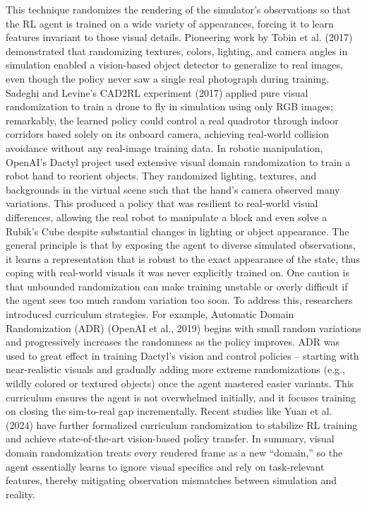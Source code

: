 This technique randomizes the rendering of the simulator’s observations so that the RL agent is trained on a wide variety of appearances, forcing it to learn features invariant to those visual details. Pioneering work by Tobin et al. (2017) demonstrated that randomizing textures, colors, lighting, and camera angles in simulation enabled a vision-based object detector to generalize to real images, even though the policy never saw a single real photograph during training. Sadeghi and Levine’s CAD2RL experiment (2017) applied pure visual randomization to train a drone to fly in simulation using only RGB images; remarkably, the learned policy could control a real quadrotor through indoor corridors based solely on its onboard camera, achieving real-world collision avoidance without any real-image training data. In robotic manipulation, OpenAI’s Dactyl project used extensive visual domain randomization to train a robot hand to reorient objects. They randomized lighting, textures, and backgrounds in the virtual scene such that the hand’s camera observed many variations. This produced a policy that was resilient to real-world visual differences, allowing the real robot to manipulate a block and even solve a Rubik’s Cube despite substantial changes in lighting or object appearance. The general principle is that by exposing the agent to diverse simulated observations, it learns a representation that is robust to the exact appearance of the state, thus coping with real-world visuals it was never explicitly trained on. One caution is that unbounded randomization can make training unstable or overly difficult if the agent sees too much random variation too soon. To address this, researchers introduced curriculum strategies. For example, Automatic Domain Randomization (ADR) (OpenAI et al., 2019) begins with small random variations and progressively increases the randomness as the policy improves. ADR was used to great effect in training Dactyl’s vision and control policies – starting with near-realistic visuals and gradually adding more extreme randomizations (e.g., wildly colored or textured objects) once the agent mastered easier variants. This curriculum ensures the agent is not overwhelmed initially, and it focuses training on closing the sim-to-real gap incrementally. Recent studies like Yuan et al. (2024) have further formalized curriculum randomization to stabilize RL training and achieve state-of-the-art vision-based policy transfer. In summary, visual domain randomization treats every rendered frame as a new “domain,” so the agent essentially learns to ignore visual specifics and rely on task-relevant features, thereby mitigating observation mismatches between simulation and reality.

